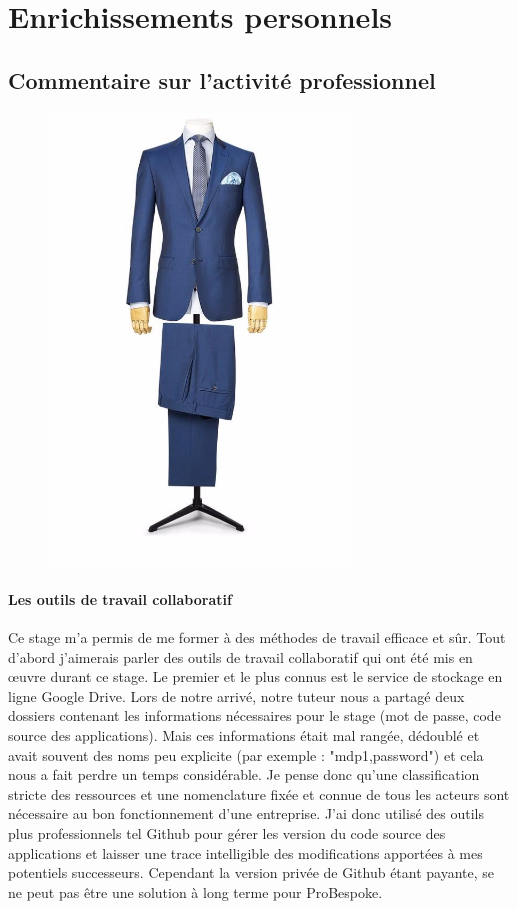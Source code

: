 \section{Enrichissements personnels}
\subsection{Commentaire sur l'activité professionnel}

\begin{figure}
\includegraphics[width=8cm]{image/bleuciel.jpg}
\end{figure}
\paragraph{Les outils de travail collaboratif}
Ce stage m'a permis de me former à des méthodes de travail efficace et sûr. Tout d'abord j'aimerais parler des outils de travail collaboratif qui ont été mis en œuvre durant ce stage. Le premier et le plus connus est le service de stockage en ligne Google Drive. Lors de notre arrivé, notre tuteur nous a partagé deux dossiers contenant les informations nécessaires pour le stage (mot de passe, code source des applications). Mais ces informations était mal rangée, dédoublé et avait souvent des noms peu explicite (par exemple : "mdp1,password") et cela nous a fait perdre un temps considérable. Je pense donc qu'une classification stricte des ressources et une nomenclature fixée et connue de tous les acteurs sont nécessaire au bon fonctionnement d'une entreprise. J'ai donc utilisé des outils plus professionnels tel Github pour gérer les version du code source des applications et laisser une trace intelligible des modifications apportées à mes potentiels successeurs. Cependant la version privée de Github étant payante, se ne peut pas être une solution à long terme pour ProBespoke.

